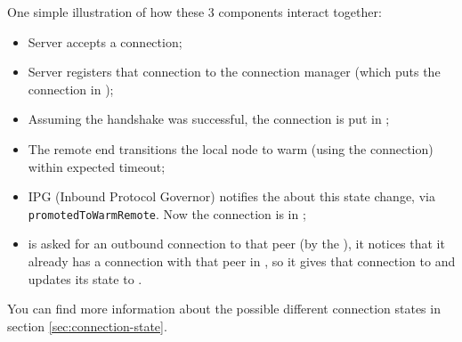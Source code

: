 One simple illustration of how these 3 components interact together:

\begin{itemize}
    \item Server accepts a connection;
    \item Server registers that connection to the connection manager (which puts the
      connection in \UnnegotiatedStateIn{});
    \item Assuming the handshake was successful, the connection is put in
      \InboundIdleStateDup{};
    \item The remote end transitions the local node to warm (using the connection) within expected timeout;
    \item IPG (Inbound Protocol Governor) notifies the \Connmngr{} about this state
      change, via \texttt{promotedToWarmRemote}. Now the connection is
      in \InboundStateDup{};
    \item \Connmngr{} is asked for an outbound connection to that peer (by the \ptopgov{}), it notices
      that it already has a connection with that peer in \InboundStateDup{}, so it gives
      that connection to \ptopgov{} and updates its state to \DuplexState{}.
\end{itemize}

You can find more information about the possible different connection states in section
\ref{sec:connection-state}.

